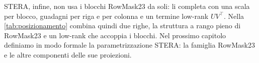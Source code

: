 STERA, infine, non usa i blocchi RowMask23 da soli: li completa con una scala per blocco, guadagni per riga e per colonna e un termine low-rank $UV^\top$. Nella \autoref{tab:posizionamento} combina quindi due righe, la struttura a rango pieno di RowMask23 e un low-rank che accoppia i blocchi. Nel prossimo capitolo definiamo in modo formale la parametrizzazione STERA: la famiglia RowMask23 e le altre componenti delle sue proiezioni.
